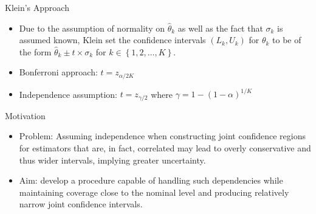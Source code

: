 \documentclass[
  11pt,
  ignorenonframetext,
]{beamer}
\providecommand{\tightlist}{%
  \setlength{\itemsep}{0pt}\setlength{\parskip}{0pt}}
\begin{document}
\begin{frame}{Klein's Approach}
\label{kleins-approach-3}
\begin{itemize}[<+->]
\tightlist
\item
  Due to the assumption of normality on \(\hat{\theta}_k\) as well as
  the fact that \(\sigma_k\) is assumed known, Klein set the confidence
  intervals \((L_k,U_k)\) for \(\theta_k\) to be of the form
  \(\hat \theta_k \pm t \times \sigma_k\) for
  \(k \in \left\{1, 2, \dots, K\right\}\).
\end{itemize}

\begin{itemize}[<+->]
\tightlist
\item
  Bonferroni approach: \(t = z_{\alpha/2K}\)
\end{itemize}

\begin{itemize}[<+->]
\tightlist
\item
  Independence assumption: \(t = z_{\gamma/2}\) where
  \(\gamma=1-(1-\alpha)^{1/K}\)
\end{itemize}

\end{frame}

\begin{frame}{Motivation}
\label{motivation}
\begin{itemize}[<+->]
\tightlist
\item
  Problem: Assuming independence when constructing joint confidence
  regions for estimators that are, in fact, correlated may lead to
  overly conservative and thus wider intervals, implying greater
  uncertainty.
\item
  Aim: develop a procedure capable of handling such dependencies while
  maintaining coverage close to the nominal level and producing
  relatively narrow joint confidence intervals.
\end{itemize}
\end{frame}
\end{document}

